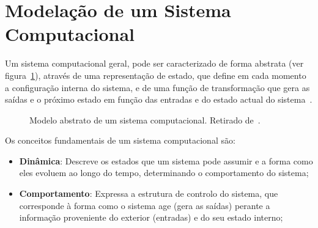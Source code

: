 \section{Modelação de um Sistema Computacional}\label{sec:modelacao-de-um-sistema-computacional}

Um sistema computacional geral, pode ser caracterizado de forma abstrata (ver figura~\ref{fig:sistema-computacional-abstrato}), através de uma representação de estado, que define em cada momento a configuração interna do
sistema, e de uma função de transformação que gera as saídas e o próximo estado em
função das entradas e do estado actual do sistema~\cite{isel:iasa:slides:intro-eng-soft-parte-3}.

\begin{figure}[H]
    \begin{center}
    \end{center}
    \caption{Modelo abstrato de um sistema computacional.
    Retirado de~\cite{isel:iasa:slides:intro-eng-soft-parte-3}.}\label{fig:sistema-computacional-abstrato}
\end{figure}

Os conceitos fundamentais de um sistema computacional são:

\begin{itemize}
    \item \textbf{Dinâmica}: Descreve os estados que um sistema pode assumir
    e a forma como eles evoluem ao longo do tempo,
    determinando o comportamento do sistema;
    \item \textbf{Comportamento}: Expressa a estrutura de controlo do sistema, que corresponde à forma como o sistema age (gera as
    saídas) perante a informação proveniente do
    exterior (entradas) e do seu estado interno;
\end{itemize}


